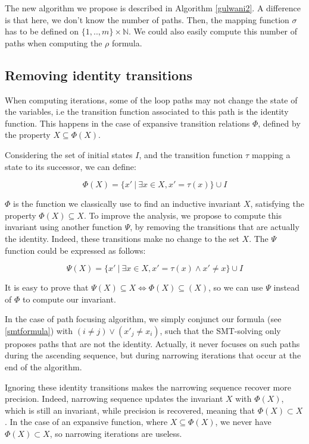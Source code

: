 \documentclass[a4paper,english,titlepage,11pt]{report}
\def\N{\mathbb{N}}
\begin{document}
The new algorithm we propose is described in Algorithm \ref{gulwani2}.
A difference is that here, we don't know the number of paths. Then, the mapping
function $\sigma$ has to be defined on $\{1,..,m\} \times \N$. We could also
easily compute this number of paths when computing the $\rho$ formula.


	\subsection{Removing identity transitions}

	When computing iterations, some of the loop paths may not change the state
	of the variables, i.e the transition function associated to this path is the
	identity function. This happens in the case of expansive transition
	relations $\Phi$, defined by the property $X \subseteq \Phi(X)$.

	Considering the set of initial states $I$, and the transition function 
	$\tau$ mapping a state to its successor, we can define:

	$$\Phi(X) = \{ x'\ |\ \exists x \in X, x' = \tau(x)\} \cup I$$

	$\Phi$ is the function we classically use to find an inductive invariant
	$X$, satisfying the property $\Phi(X) \subseteq X$. To improve the analysis,
	we propose to compute this invariant using another function $\Psi$, by
	removing the transitions that are actually the identity. Indeed, these
	transitions make no change to the set $X$.
	The $\Psi$ function could be expressed as follows:

	$$\Psi(X) = \{ x'\ |\ \exists x \in X, x' = \tau(x) \wedge x' \neq x\}
	\cup I$$

	It is easy to prove that $\Psi(X) \subseteq X \Leftrightarrow \Phi(X)
	\subseteq(X)$, so we can use $\Psi$ instead of $\Phi$ to compute our
	invariant.

	In the case of path focusing algorithm, we simply conjunct our formula
	(see \ref{smtformula}) with
	$(i \neq j) \vee (x'_j \neq x_i)$, such that the SMT-solving only proposes
	paths that are not the identity. Actually, it never focuses on such paths
	during the ascending sequence, but during narrowing iterations that occur 
	at the end of the algorithm.

	Ignoring these identity transitions makes the narrowing sequence recover
	more precision.
	Indeed, narrowing sequence updates the invariant $X$ with $\Phi(X)$, which
	is still an invariant, while precision is recovered, meaning that $\Phi(X)
	\subset X$. In the case of an expansive function, where $X \subseteq
	\Phi(X)$, we never have $\Phi(X) \subset X$, so narrowing iterations are
	useless.
\end{document}

